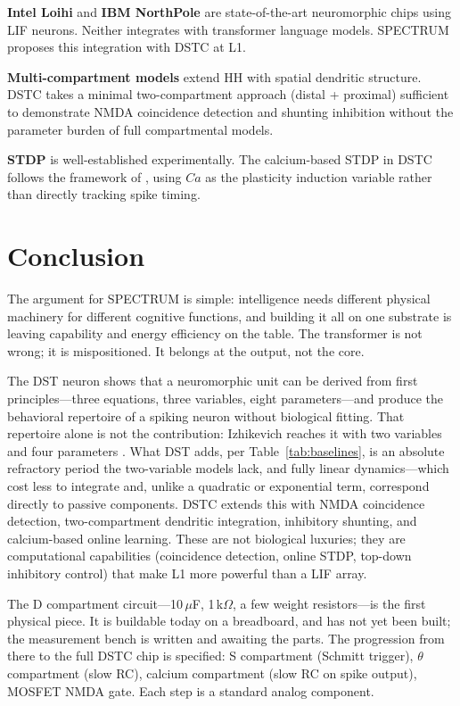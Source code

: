 \documentclass[12pt]{article}
\begin{document}
\textbf{Intel Loihi} \cite{davies2021} and \textbf{IBM NorthPole} \cite{ibm2023} are state-of-the-art neuromorphic chips using LIF neurons. Neither integrates with transformer language models. SPECTRUM proposes this integration with DSTC at L1.

\textbf{Multi-compartment models} \cite{mainen1996} extend HH with spatial dendritic structure. DSTC takes a minimal two-compartment approach (distal + proximal) sufficient to demonstrate NMDA coincidence detection and shunting inhibition without the parameter burden of full compartmental models.

\textbf{STDP} \cite{bi1998} is well-established experimentally. The calcium-based STDP in DSTC follows the framework of \cite{shouval2002}, using $Ca$ as the plasticity induction variable rather than directly tracking spike timing.

\section{Conclusion}
\label{sec:conclusion}

The argument for SPECTRUM is simple: intelligence needs different physical machinery for different cognitive functions, and building it all on one substrate is leaving capability and energy efficiency on the table. The transformer is not wrong; it is mispositioned. It belongs at the output, not the core.

The DST neuron shows that a neuromorphic unit can be derived from first principles---three equations, three variables, eight parameters---and produce the behavioral repertoire of a spiking neuron without biological fitting. That repertoire alone is not the contribution: Izhikevich reaches it with two variables and four parameters \cite{izhikevich2003}. What DST adds, per Table~\ref{tab:baselines}, is an absolute refractory period the two-variable models lack, and fully linear dynamics---which cost less to integrate and, unlike a quadratic or exponential term, correspond directly to passive components. DSTC extends this with NMDA coincidence detection, two-compartment dendritic integration, inhibitory shunting, and calcium-based online learning. These are not biological luxuries; they are computational capabilities (coincidence detection, online STDP, top-down inhibitory control) that make L1 more powerful than a LIF array.

The D compartment circuit---10\,$\mu$F, 1\,k$\Omega$, a few weight resistors---is the first physical piece. It is buildable today on a breadboard, and has not yet been built; the measurement bench is written and awaiting the parts. The progression from there to the full DSTC chip is specified: S compartment (Schmitt trigger), $\theta$ compartment (slow RC), calcium compartment (slow RC on spike output), MOSFET NMDA gate. Each step is a standard analog component.
\end{document}
